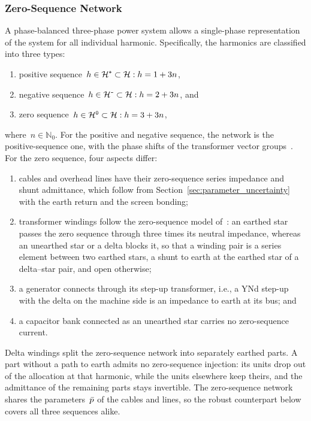 \subsubsection{Zero-Sequence Network}

A phase-balanced three-phase power system allows a single-phase representation of the system for all individual harmonic. Specifically, the harmonics are classified into three types:
\begin{enumerate}
    \item [1)] positive sequence~$h \in \mathcal{H}^{\texttt{+}} \subset \mathcal{H}: h = 1+3n$,
    \item [2)] negative sequence~$h \in \mathcal{H}^{\texttt{-}} \subset \mathcal{H}: h = 2+3n$, and
    \item [3)] zero sequence~$h \in \mathcal{H}^{\texttt{0}} \subset \mathcal{H}: h = 3+3n$,
\end{enumerate}
where~$n \in \mathbb{N}_{0}$. For the positive and negative sequence, the network is the positive-sequence one, with the phase shifts of the transformer vector groups~\cite{vanacker_shhc}. For the zero sequence, four aspects differ:
\begin{enumerate}
    \item[(i)] cables and overhead lines have their zero-sequence series impedance and shunt admittance, which follow from Section~\ref{sec:parameter_uncertainty} with the earth return and the screen bonding;
    \item[(ii)] transformer windings follow the zero-sequence model of~\cite{geth_harmonic_2022}: an earthed star passes the zero sequence through three times its neutral impedance, whereas an unearthed star or a delta blocks it, so that a winding pair is a series element between two earthed stars, a shunt to earth at the earthed star of a delta--star pair, and open otherwise;
    \item[(iii)] a generator connects through its step-up transformer, i.e., a YNd step-up with the delta on the machine side is an impedance to earth at its bus; and
    \item[(iv)] a capacitor bank connected as an unearthed star carries no zero-sequence current.
\end{enumerate}
Delta windings split the zero-sequence network into separately earthed parts. A part without a path to earth admits no zero-sequence injection: its units drop out of the allocation at that harmonic, while the units elsewhere keep theirs, and the admittance of the remaining parts stays invertible. The zero-sequence network shares the parameters~$\bar{p}$ of the cables and lines, so the robust counterpart below covers all three sequences alike.

